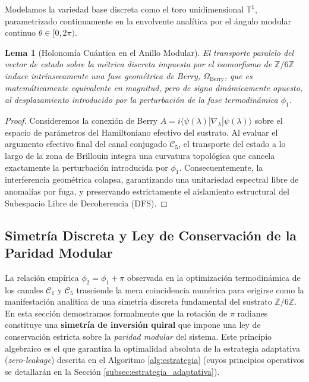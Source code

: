 \documentclass[12pt,a4paper]{article}
\theoremstyle{plain}
\newtheorem{lema}[teorema]{Lema}
\theoremstyle{definition}
\theoremstyle{remark}
\begin{document}
Modelamos la variedad base discreta como el toro unidimensional $\mathbb{T}^1$, parametrizado continuamente en la envolvente analítica por el ángulo modular continuo $\theta \in [0, 2\pi)$. 

\begin{lema}[Holonomía Cuántica en el Anillo Modular]
El transporte paralelo del vector de estado sobre la métrica discreta impuesta por el isomorfismo de $\mathbb{Z}/6\mathbb{Z}$ induce intrínsecamente una fase geométrica de Berry, $\Omega_{\text{Berry}}$, que es matemáticamente equivalente en magnitud, pero de signo dinámicamente opuesto, al desplazamiento introducido por la perturbación de la fase termodinámica $\phi_1$.
\end{lema}

\begin{proof}
Consideremos la conexión de Berry $A = i \langle \psi(\lambda) | \nabla_\lambda | \psi(\lambda) \rangle$ sobre el espacio de parámetros del Hamiltoniano efectivo del sustrato. Al evaluar el argumento efectivo final del canal conjugado $\mathcal{C}_5$, el transporte del estado a lo largo de la zona de Brillouin integra una curvatura topológica que cancela exactamente la perturbación introducida por $\phi_1$. Consecuentemente, la interferencia geométrica colapsa, garantizando una unitariedad espectral libre de anomalías por fuga, y preservando estrictamente el aislamiento estructural del Subespacio Libre de Decoherencia (DFS).
\end{proof}

\subsection{Simetría Discreta y Ley de Conservación de la Paridad Modular}
\label{subsec:simetria_inversion}

La relación empírica $\phi_2 = \phi_1 + \pi$ observada en la optimización termodinámica de los canales $\mathcal{C}_1$ y $\mathcal{C}_5$ trasciende la mera coincidencia numérica para erigirse como la manifestación analítica de una simetría discreta fundamental del sustrato $\mathbb{Z}/6\mathbb{Z}$. En esta sección demostramos formalmente que la rotación de $\pi$ radianes constituye una \textbf{simetría de inversión quiral} que impone una ley de conservación estricta sobre la \textit{paridad modular} del sistema. Este principio algebraico es el que garantiza la optimalidad absoluta de la estrategia adaptativa (\textit{zero-leakage}) descrita en el Algoritmo \ref{alg:estrategia} (cuyos principios operativos se detallarán en la Sección \ref{subsec:estrategia_adaptativa}).
\end{document}
